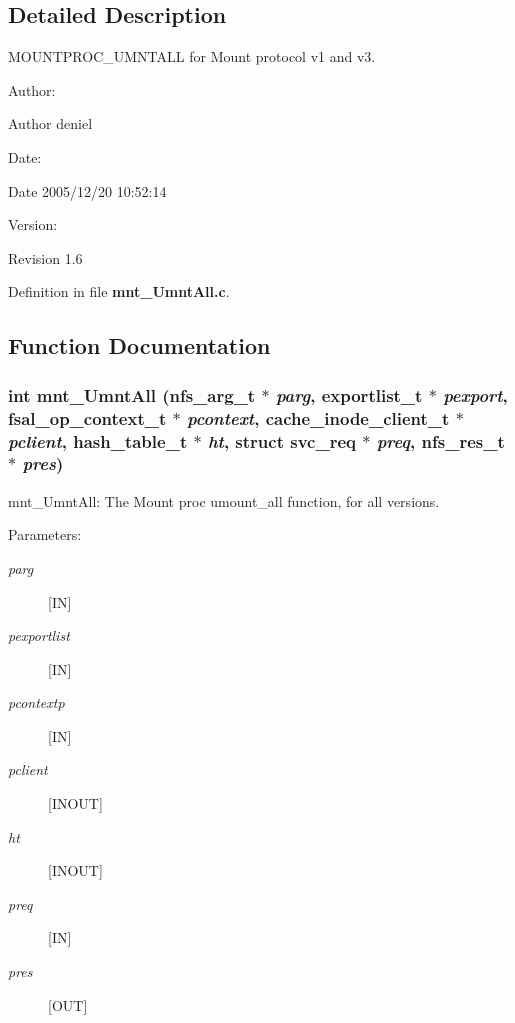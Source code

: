 \subsection{Detailed Description}
MOUNTPROC\_\-UMNTALL for Mount protocol v1 and v3. 

\begin{Desc}
\item[Author:]\end{Desc}
\begin{Desc}
\item[Author]deniel \end{Desc}
\begin{Desc}
\item[Date:]\end{Desc}
\begin{Desc}
\item[Date]2005/12/20 10:52:14 \end{Desc}
\begin{Desc}
\item[Version:]\end{Desc}
\begin{Desc}
\item[Revision]1.6 \end{Desc}


Definition in file {\bf mnt\_\-UmntAll.c}.

\subsection{Function Documentation}
\subsubsection[{mnt\_\-UmntAll}]{\setlength{\rightskip}{0pt plus 5cm}int mnt\_\-UmntAll (nfs\_\-arg\_\-t $\ast$ {\em parg}, \/  exportlist\_\-t $\ast$ {\em pexport}, \/  fsal\_\-op\_\-context\_\-t $\ast$ {\em pcontext}, \/  cache\_\-inode\_\-client\_\-t $\ast$ {\em pclient}, \/  hash\_\-table\_\-t $\ast$ {\em ht}, \/  struct svc\_\-req $\ast$ {\em preq}, \/  nfs\_\-res\_\-t $\ast$ {\em pres})}\label{mnt__UmntAll_8c_686e062f1894e91d27e514ed29a3a4b7}


mnt\_\-UmntAll: The Mount proc umount\_\-all function, for all versions.

\begin{Desc}
\item[Parameters:]
\begin{description}
\item[{\em parg}][IN] \item[{\em pexportlist}][IN] \item[{\em pcontextp}][IN] \item[{\em pclient}][INOUT] \item[{\em ht}][INOUT] \item[{\em preq}][IN] \item[{\em pres}][OUT] \end{description}
\end{Desc}


